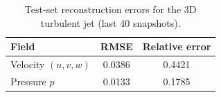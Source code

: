\begin{table}[htbp]
  \centering
  \caption{Test-set reconstruction errors for the 3D turbulent jet (last 40 snapshots).}
  \label{tab:et:3djet-errors}
  \begin{tabular}{lcc}
    \toprule
    Field & RMSE & Relative error \\
    \midrule
    Velocity $(u,v,w)$ & 0.0386 & 0.4421 \\
    Pressure $p$       & 0.0133 & 0.1785 \\
    \bottomrule
  \end{tabular}
\end{table}
